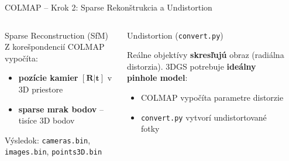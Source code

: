 \documentclass[aspectratio=169]{beamer}
\begin{document}
\begin{frame}{COLMAP – Krok 2: Sparse Rekonštrukcia a Undistortion}

\begin{columns}[t]

\begin{block}{Sparse Reconstruction (SfM)}
Z korešpondencií COLMAP vypočíta:
\begin{itemize}\setlength{\itemsep}{2pt}
    \item \textbf{pozície kamier} $[\mathbf{R}|\mathbf{t}]$ v 3D priestore
    \item \textbf{sparse mrak bodov} – tisíce 3D bodov
\end{itemize}
{\footnotesize Výsledok: \texttt{cameras.bin}, \texttt{images.bin}, \texttt{points3D.bin}}
\end{block}

\vspace{0.08cm}
\begin{block}{Undistortion (\texttt{convert.py})}
{\small Reálne objektívy \textbf{skresľujú} obraz (radiálna distorzia). 3DGS potrebuje \textbf{ideálny pinhole model}:
\begin{itemize}\setlength{\itemsep}{0pt}
    \item COLMAP vypočíta parametre distorzie
    \item \texttt{convert.py} vytvorí undistortované fotky
\end{itemize}}
\end{block}

\begin{center}
\end{center}
\end{columns}

\end{frame}
\end{document}
